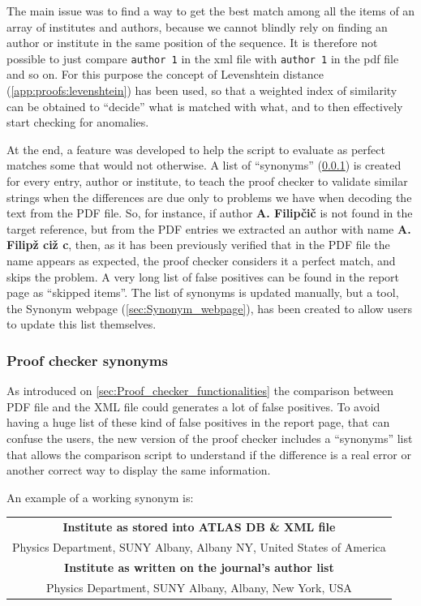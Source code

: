 The main issue was to find a way to get the best match among all the items of an array of institutes and authors,
because we cannot blindly rely on finding an author or institute in the same position of the sequence.
It is therefore not possible to just compare \texttt{author~1} in the xml file with \texttt{author~1} in the pdf file and so on.
For this purpose the concept of Levenshtein distance (\cref{app:proofs:levenshtein}) has been used,
so that a weighted index of similarity can be obtained to \enquote{decide} what is matched with what, and to then effectively start checking for anomalies.

At the end, a feature was developed to help the script to evaluate as perfect matches some that would not otherwise.
A list of \enquote{synonyms} (\cref{sec:Proof_checker_synonyms}) is created for every entry, author or institute,
to teach the proof checker to validate similar strings when the differences are due only to problems we have when decoding the text from the PDF file.
So, for instance, if author \textbf{A. Filipčič} is not found in the target reference,
but from the PDF entries we extracted an author with name \textbf{A. Filipž ciž c}, then,
as it has been previously verified that in the PDF file the name appears as expected, the proof checker considers it a perfect match, and skips the problem.
A very long list of false positives can be found in the report page as \enquote{skipped items}.
The list of synonyms is updated manually, but a tool, the Synonym webpage (\cref{sec:Synonym_webpage}), has been created to allow users to update this list themselves.


\subsubsection{Proof checker synonyms}%
\label{sec:Proof_checker_synonyms}

As introduced on \cref{sec:Proof_checker_functionalities} the comparison between PDF file and the XML file could generates a lot of false positives.
To avoid having a huge list of these kind of false positives in the report page, that can confuse the users, the new version of the proof checker includes a \enquote{synonyms} list that allows the comparison script to understand if the difference is a real error or another correct way to display the same information.

An example of a working synonym is:
\begin{table}[htb]
  \centering
  \begin{tabular}{c}
  \textbf{Institute as stored into ATLAS DB \& XML file} \\
  Physics Department, SUNY Albany, Albany NY, United States of America \\
  \midrule
  \textbf{Institute as written on the journal's author list} \\
  Physics Department, SUNY Albany, Albany, New York, USA
  \end{tabular}
\end{table}

